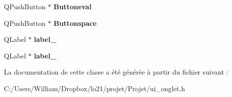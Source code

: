 \begin{DoxyCompactItemize}
\item 
\hypertarget{class_ui___widget_a04cf1b7c4d01e5e9d0720c1782877a68}{Q\-Push\-Button $\ast$ {\bfseries Buttoneval}}\label{class_ui___widget_a04cf1b7c4d01e5e9d0720c1782877a68}

\item 
\hypertarget{class_ui___widget_a51b15ede6f8aa722585d9be06f9c92f8}{Q\-Push\-Button $\ast$ {\bfseries Buttonspace}}\label{class_ui___widget_a51b15ede6f8aa722585d9be06f9c92f8}

\item 
\hypertarget{class_ui___widget_adfcab5569ac08da197e14dba01390755}{Q\-Label $\ast$ {\bfseries label\-\_}}\label{class_ui___widget_adfcab5569ac08da197e14dba01390755}

\item 
\hypertarget{class_ui___widget_a6f06b143349464b5b19ac0ffe2fc084d}{Q\-Label $\ast$ {\bfseries label\-\_}}\label{class_ui___widget_a6f06b143349464b5b19ac0ffe2fc084d}

\end{DoxyCompactItemize}


La documentation de cette classe a été générée à partir du fichier suivant \-:\begin{DoxyCompactItemize}
\item 
C\-:/\-Users/\-William/\-Dropbox/lo21/projet/\-Projet/ui\-\_\-onglet.\-h\end{DoxyCompactItemize}
